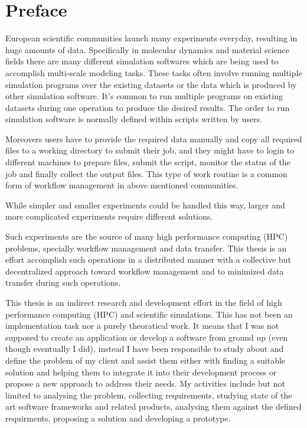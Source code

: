 \chapter*{Preface}
\label{cha:preface}

European scientific communities launch many experiments everyday, resulting in huge amounts
of data. Specifically in molecular dynamics and material science fields there are many different
simulation softwares which are being used to accomplish multi-scale modeling tasks. These tasks
often involve running multiple simulation programs over the existing datasets or the data which is
produced by other simulation software. It's common to run multiple programs on existing datasets
during one operation to produce the desired results. The order to run simulation software is normally 
defined within scripts written by users. 

Moreovers users have to provide the required data manually and copy all required files to a working
directory to submit their job, and they might have to login to different machines to prepare files,
submit the script, monitor the status of the job and finally collect the output files. 
This type of work routine is a common form of workflow management in above mentioned communities.

While simpler and smaller experiments could be handled this way, larger and more complicated experiments
require different solutions. 

Such experiments are the source of many high performance computing (HPC) problems, specially workflow management and data transfer.
This thesis is an effort accomplish such operations in a distributed manner with a 
collective but decentralized approach toward workflow management and to minimized data transfer during such operations.

This thesis is an indirect research and development effort in the field of high performance computing (HPC) and scientific simulations.
This has not been an implementation task nor a purely theoratical work. 
It means that I was not supposed to create an application or develop a software from ground up (even though eventually I did), instead
I have been responsible to study about and define the problem of my client and assist them either with 
finding a suitable solution and helping them to integrate it into their development process or propose a new approach to address their 
needs. My activities include but not limited to analysing the problem, collecting requirements,
studying state of the art software frameworks and related products,
analysing them against the defined requirments, proposing a solution and developing a prototype.

